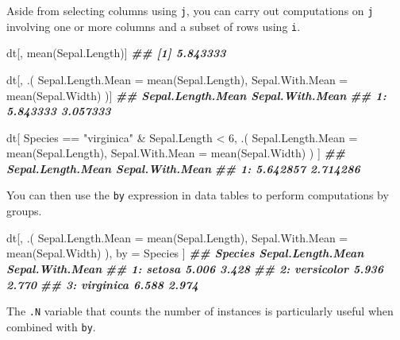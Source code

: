 \documentclass[
]{book}
\newenvironment{Shaded}{\begin{snugshade}}{\end{snugshade}}
\newcommand{\AttributeTok}[1]{\textcolor[rgb]{0.77,0.63,0.00}{#1}}
\newcommand{\DecValTok}[1]{\textcolor[rgb]{0.00,0.00,0.81}{#1}}
\newcommand{\DocumentationTok}[1]{\textcolor[rgb]{0.56,0.35,0.01}{\textbf{\textit{#1}}}}
\newcommand{\FunctionTok}[1]{\textcolor[rgb]{0.00,0.00,0.00}{#1}}
\newcommand{\NormalTok}[1]{#1}
\newcommand{\OtherTok}[1]{\textcolor[rgb]{0.56,0.35,0.01}{#1}}
\newcommand{\SpecialCharTok}[1]{\textcolor[rgb]{0.00,0.00,0.00}{#1}}
\newcommand{\StringTok}[1]{\textcolor[rgb]{0.31,0.60,0.02}{#1}}
\begin{document}
Aside from selecting columns using \texttt{j}, you can carry out computations on \texttt{j} involving one or more columns and a subset of rows using \texttt{i}.

\begin{Shaded}
\begin{Highlighting}[]

\NormalTok{dt[, }\FunctionTok{mean}\NormalTok{(Sepal.Length)]}
\DocumentationTok{\#\# [1] 5.843333}

\NormalTok{dt[, .(}
  \AttributeTok{Sepal.Length.Mean =} \FunctionTok{mean}\NormalTok{(Sepal.Length),}
  \AttributeTok{Sepal.With.Mean =} \FunctionTok{mean}\NormalTok{(Sepal.Width)}
\NormalTok{)]}
\DocumentationTok{\#\#    Sepal.Length.Mean Sepal.With.Mean}
\DocumentationTok{\#\# 1:          5.843333        3.057333}

\NormalTok{dt[}
\NormalTok{  Species }\SpecialCharTok{==} \StringTok{"virginica"} \SpecialCharTok{\&}\NormalTok{ Sepal.Length }\SpecialCharTok{\textless{}} \DecValTok{6}\NormalTok{,}
\NormalTok{  .(}
    \AttributeTok{Sepal.Length.Mean =} \FunctionTok{mean}\NormalTok{(Sepal.Length),}
    \AttributeTok{Sepal.With.Mean =} \FunctionTok{mean}\NormalTok{(Sepal.Width)}
\NormalTok{  )}
\NormalTok{]}
\DocumentationTok{\#\#    Sepal.Length.Mean Sepal.With.Mean}
\DocumentationTok{\#\# 1:          5.642857        2.714286}
\end{Highlighting}
\end{Shaded}

You can then use the \texttt{by} expression in data tables to perform computations by groups.

\begin{Shaded}
\begin{Highlighting}[]

\NormalTok{dt[, .(}
  \AttributeTok{Sepal.Length.Mean =} \FunctionTok{mean}\NormalTok{(Sepal.Length),}
  \AttributeTok{Sepal.With.Mean =} \FunctionTok{mean}\NormalTok{(Sepal.Width)}
\NormalTok{),}
\NormalTok{by }\OtherTok{=}\NormalTok{ Species}
\NormalTok{]}
\DocumentationTok{\#\#       Species Sepal.Length.Mean Sepal.With.Mean}
\DocumentationTok{\#\# 1:     setosa             5.006           3.428}
\DocumentationTok{\#\# 2: versicolor             5.936           2.770}
\DocumentationTok{\#\# 3:  virginica             6.588           2.974}
\end{Highlighting}
\end{Shaded}

The \texttt{.N} variable that counts the number of instances is particularly useful when combined with \texttt{by}.
\end{document}
